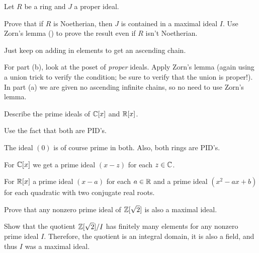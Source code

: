 \begin{sproblem}
	\label{prob:krull_max_ideal}
	Let $R$ be a ring and $J$ a proper ideal.
	\begin{enumerate}[(a)]
		\ii Prove that if $R$ is Noetherian,
		then $J$ is contained in a maximal ideal $I$.
		\ii Use Zorn's lemma ()
		to prove the result even if $R$ isn't Noetherian.
	\end{enumerate}
	\begin{hint}
		Just keep on adding in elements to get an ascending chain.
	\end{hint}
	\begin{sol}
		For part (b), look at the poset of \emph{proper} ideals.
		Apply Zorn's lemma (again using a union trick to verify the condition;
		be sure to verify that the union is proper!).
		In part (a) we are given no ascending infinite chains,
		so no need to use Zorn's lemma.
	\end{sol}
\end{sproblem}

\begin{problem}
	[{$\Spec k[x]$}]
	Describe the prime ideals of $\mathbb C[x]$ and $\mathbb R[x]$.
	\begin{hint}
		Use the fact that both are PID's.
	\end{hint}
	\begin{sol}
		The ideal $(0)$ is of course prime in both.
		Also, both rings are PID's.

		For $\mathbb C[x]$ we get a prime ideal $(x-z)$ for each $z \in \mathbb C$.

		For $\mathbb R[x]$ a prime ideal $(x-a)$ for each $a \in \mathbb R$
		and a prime ideal $(x^2 - ax + b)$ for each quadratic
		with two conjugate real roots.
	\end{sol}
\end{problem}

\begin{problem}
	Prove that any nonzero prime ideal of $\mathbb Z[\sqrt 2]$ is also a maximal ideal.
	\label{prob:dedekind_sample}
	\begin{hint}
		Show that the quotient $\mathbb Z[\sqrt2]/I$ has finitely many elements
		for any nonzero prime ideal $I$.
		Therefore, the quotient is an integral domain, it is also a field,
		and thus $I$ was a maximal ideal.
	\end{hint}
\end{problem}

